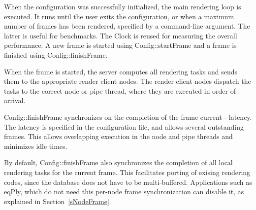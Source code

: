 \documentclass[10pt,a4]{scrartcl}
\newcommand{\sref}[1]{Section~\ref{#1}}
\begin{document}
When the configuration was successfully initialized, the main rendering
loop is executed. It runs until the user exits the
configuration, or when a maximum number of frames has been rendered,
specified by a command-line argument. The latter is useful for
benchmarks. The \textsf{Clock} is reused for measuring the overall
performance. A new frame is started using \textsf{Config::startFrame}
and a frame is finished using \textsf{Config::finishFrame}.

When the frame is started, the server computes all rendering tasks and
sends them to the appropriate render client nodes. The render client
nodes dispatch the tasks to the correct node or pipe thread, where they
are executed in order of arrival.

\textsf{Config::finishFrame} synchronizes on the completion of the frame
\textsf{current - latency}. The latency is specified in the
configuration file, and allows several outstanding frames. This allows
overlapping execution in the node and pipe threads and minimizes idle
times. 

By default, \textsf{Config::finish\-Fra\-me} also synchronizes the
completion of all local rendering tasks for the current frame. This
facilitates porting of exising rendering codes, since the database does
not have to be multi-buffered. Applications such as \textsf{eqPly}, which
do not need this per-node frame synchronization can disable it, as
explained in \sref{sNodeFrame}.
\end{document}
